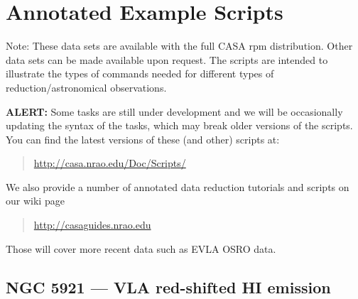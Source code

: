 

\chapter[Appendix: Annotated Example Scripts]{Annotated Example Scripts}
\label{chapter:scripts}

Note: These data sets are available with the full
CASA rpm distribution.  Other data sets can be made available upon
request.  The scripts are intended to illustrate the types of
commands needed for different types of reduction/astronomical
observations.

{\bf ALERT:} Some tasks are still under development and we will be
occasionally updating the syntax of the tasks, which may break older
versions of the scripts. You can find the latest versions of these
(and other) scripts at:
\begin{quote}
   \url{http://casa.nrao.edu/Doc/Scripts/}
\end{quote}

We also provide a number of annotated data reduction tutorials and
scripts on our wiki page 

\begin{quote}
\url{http://casaguides.nrao.edu}
\end{quote}

Those will cover more recent data such as EVLA OSRO data.

\section{NGC 5921 --- VLA red-shifted HI emission}
\label{section:scripts.ngc5921}

